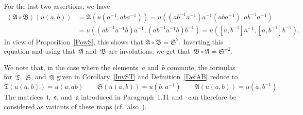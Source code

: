 \documentclass[12pt]{article}
\makeatletter
\theoremstyle{definition}
\theoremstyle{break}
\renewenvironment{proof}[1][\proofname]{\par
\vspace{-5pt}%
\pushQED{\qed}%
\normalfont
\topsep0pt \partopsep0pt %
\trivlist
\item[\hskip\labelsep
\bfseries
#1\@addpunct{.}]\ignorespaces
}{%
\popQED\endtrivlist\@endpefalse
\addvspace{6pt plus 6pt} %
}
\newcommand{\fA}{\mathfrak{A}}
\newcommand{\fB}{\mathfrak{B}}
\newcommand{\fS}{\mathfrak{S}}
\newcommand{\fT}{\mathfrak{T}}
\newcommand{\fa}{\mathfrak{a}}
\newcommand{\fs}{\mathfrak{s}}
\newcommand{\ft}{\mathfrak{t}}
\renewcommand{\1}{\mathbbm{1}}
\newcommand{\uu}{u}
\makeatother
\begin{document}
\begin{proof}
\begin{parlist}
\item
For the last two assertions, we have
\begin{align*}
(\fA \circ \fB)(\uu(a,b)) &= \fA(\uu(a^{-1}, a b a^{-1})) =
\uu((a b^{-1} a^{-1}) a^{-1} (a b a^{-1}), a b^{-1} a^{-1}) \\
&=\uu((a b^{-1} a^{-1} b) a^{-1}, (a b^{-1} a^{-1} b) b^{-1}) =
\uu([a,b^{-1}] a^{-1}, [a,b^{-1}] b^{-1}).
\end{align*}
In view of Proposition~\ref{PowS}, this shows that
$\fA \circ \fB = \fS^2$. Inverting this equation and using that~$\fA$ and~$\fB$ are involutions, we get that~$\fB \circ \fA = \fS^{-2}$.
\qedhere
\end{parlist}
\end{proof}

We note that, in the case where the elements~$a$ and~$b$ commute, the formulas for~$\tilde{\fT}$,~$\tilde{\fS}$, and~$\fA$ given in Corollary~\ref{InvST} and Definition~\ref{DefAB} reduce to
\[\tilde{\fT}(\uu(a,b)) = \uu(a,ab) \qquad
\tilde{\fS}(\uu(a,b)) = \uu(b,a^{-1}) \qquad
\fA(\uu(a,b)) = \uu(a,b^{-1}) \]
The matrices~$\ft$,~$\fs$, and~$\fa$ introduced in Paragraph~1.11 and~\cite[Par.~1.1, p.~7]{SZ} can therefore be considered as variants of these maps (cf.~also~\cite[Sec.~5, Eq.~(5.2), p.~8545]{KSSB}).
\end{document}
